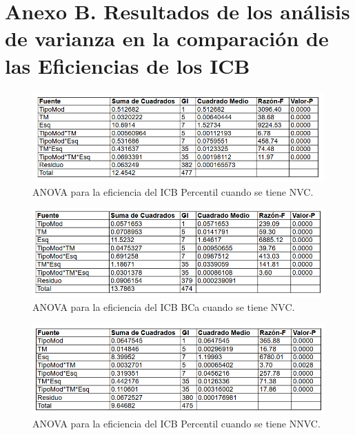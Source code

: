 \newpage
\section*{Anexo B. Resultados de los análisis de varianza en la comparación de las Eficiencias de los ICB}


\begin{figure}[ht!] 
	\centering 
	\includegraphics[width=0.95\linewidth]{img/ANOVA_Efic_ICB_Perc_NVC.png} 
	\caption{ANOVA para la eficiencia del ICB Percentil cuando se tiene NVC.} 
	\label{fig:ANOVA_Efic_ICB_Perc_NVC}
\end{figure}
\FloatBarrier


\begin{figure}[ht] 
	\centering 
	\includegraphics[width=0.95\linewidth]{img/ANOVA_Efic_ICB_BCa_NVC.png} 
	\caption{ANOVA para la eficiencia del ICB BCa cuando se tiene NVC.} 
	\label{fig:ANOVA_Efic_ICB_BCa_NVC}
\end{figure}
\FloatBarrier





\begin{figure}[ht] 
	\centering 
	\includegraphics[width=0.95\linewidth]{img/ANOVA_Efic_ICB_Perc_NNVC.png} 
	\caption{ANOVA para la eficiencia del ICB Percentil cuando se tiene NNVC.} 
	\label{fig:ANOVA_Efic_ICB_Perc_NNVC}
\end{figure}
\FloatBarrier



